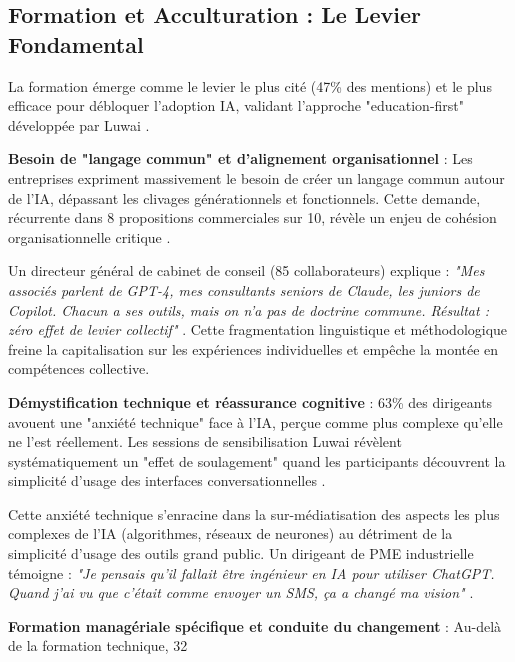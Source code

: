 \subsection{Formation et Acculturation : Le Levier Fondamental}

La formation émerge comme le levier le plus cité (47\% des mentions) et le plus efficace pour débloquer l'adoption IA, validant l'approche "education-first" développée par Luwai \cite{luwai2025meetings}.

\textbf{Besoin de "langage commun" et d'alignement organisationnel} : Les entreprises expriment massivement le besoin de créer un langage commun autour de l'IA, dépassant les clivages générationnels et fonctionnels. Cette demande, récurrente dans 8 propositions commerciales sur 10, révèle un enjeu de cohésion organisationnelle critique \cite{schein2017organizational}.

Un directeur général de cabinet de conseil (85 collaborateurs) explique : \emph{"Mes associés parlent de GPT-4, mes consultants seniors de Claude, les juniors de Copilot. Chacun a ses outils, mais on n'a pas de doctrine commune. Résultat : zéro effet de levier collectif"} \cite{luwai2025antilogy}. Cette fragmentation linguistique et méthodologique freine la capitalisation sur les expériences individuelles et empêche la montée en compétences collective.

\textbf{Démystification technique et réassurance cognitive} : 63\% des dirigeants avouent une "anxiété technique" face à l'IA, perçue comme plus complexe qu'elle ne l'est réellement. Les sessions de sensibilisation Luwai révèlent systématiquement un "effet de soulagement" quand les participants découvrent la simplicité d'usage des interfaces conversationnelles \cite{luwai2025meetings}.

Cette anxiété technique s'enracine dans la sur-médiatisation des aspects les plus complexes de l'IA (algorithmes, réseaux de neurones) au détriment de la simplicité d'usage des outils grand public. Un dirigeant de PME industrielle témoigne : \emph{"Je pensais qu'il fallait être ingénieur en IA pour utiliser ChatGPT. Quand j'ai vu que c'était comme envoyer un SMS, ça a changé ma vision"} \cite{luwai2025meetings}.

\textbf{Formation managériale spécifique et conduite du changement} : Au-delà de la formation technique, 32%

